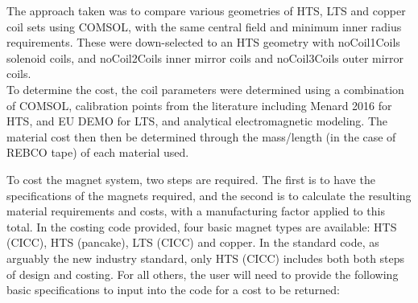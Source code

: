 The approach taken was to compare various geometries of HTS, LTS and copper coil sets using COMSOL, with the same central field and minimum inner radius requirements. These were down-selected to an HTS geometry with noCoil1Coils solenoid coils, and noCoil2Coils inner mirror coils and noCoil3Coils outer mirror coils.\\

To determine the cost, the coil parameters were determined using a combination of COMSOL, calibration points from the literature including Menard 2016 \cite{Menard2016} for HTS, and EU DEMO for LTS, and analytical electromagnetic modeling. The material cost then then be determined through the mass/length (in the case of REBCO tape) of each material used. 

To cost the magnet system, two steps are required. The first is to have the specifications of the magnets required, and the second is to calculate the resulting material requirements and costs, with a manufacturing factor applied to this total. In the costing code provided, four basic magnet types are available: HTS (CICC), HTS (pancake), LTS (CICC) and copper. In the standard code, as arguably the new industry standard, only HTS (CICC) includes both both steps of design and costing. For all others, the user will need to provide the following basic specifications to input into the code for a cost to be returned:

